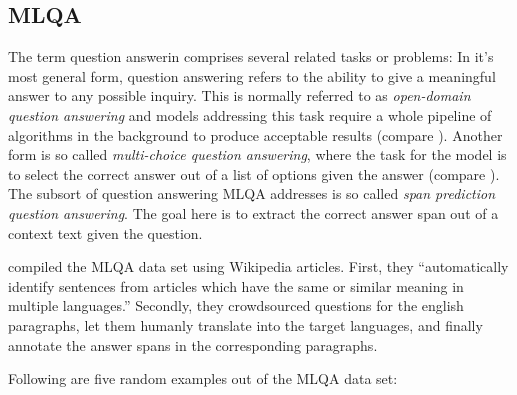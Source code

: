 \subsection{MLQA}

The term question answerin comprises several related tasks or problems: In it's most general form,
question answering refers to the ability to give a meaningful answer to any possible inquiry. This is
normally referred to as \emph{open-domain question answering} and models addressing this task require
a whole pipeline of algorithms in the background to produce acceptable results (compare \cite{chen-yih-2020-open}).
Another form is so called \emph{multi-choice question answering}, where the task for the model is to select the correct
answer out of a list of options given the answer (compare \cite{welbl2017crowdsourcing}).
The subsort of question answering MLQA addresses is so called \emph{span prediction question answering}.
The goal here is to extract the correct answer span out of a context text given the question.

\cite{lewis2019mlqa} compiled the MLQA data set using Wikipedia articles. First, they
``automatically identify sentences from \textelp{} articles which have the same or
similar meaning in multiple languages.'' Secondly, they crowdsourced questions
for the english paragraphs, let them humanly translate into the target languages,
and finally annotate the answer spans in the corresponding paragraphs.

Following are five random examples out of the MLQA data set:


